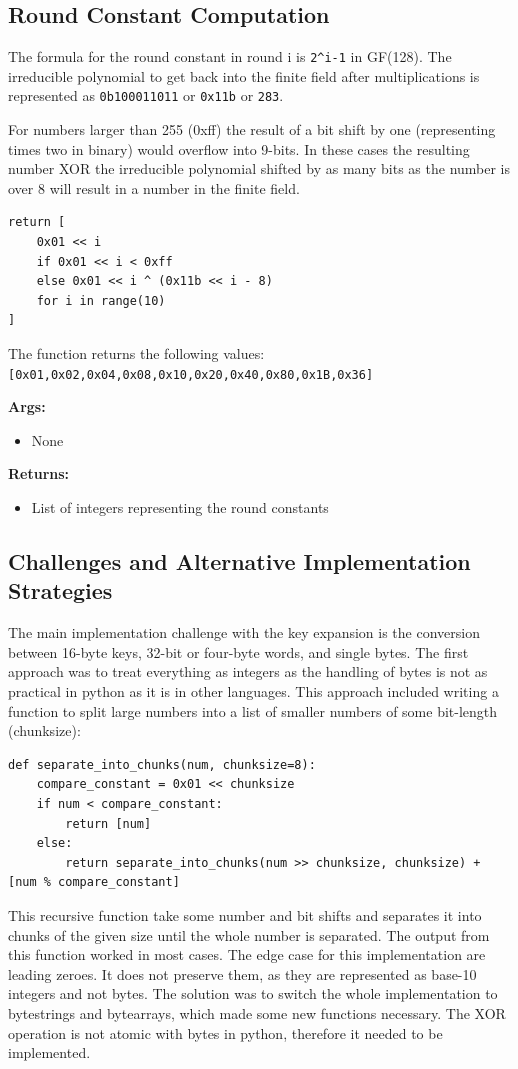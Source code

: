 \subsection{Round Constant Computation}
The formula for the round constant in round i is  \lstinline{2^i-1} in GF(128). The irreducible polynomial to get back into the finite field after multiplications is represented as  \lstinline{0b100011011} or  \lstinline{0x11b} or  \lstinline{283}.

For numbers larger than 255 (0xff) the result of a bit shift by one (representing times two in binary) would overflow into 9-bits. In these cases the resulting number XOR the irreducible polynomial shifted by as many bits as the number is over 8 will result in a number in the finite field.

\begin{lstlisting}
return [
    0x01 << i
    if 0x01 << i < 0xff
    else 0x01 << i ^ (0x11b << i - 8)
    for i in range(10)
]
\end{lstlisting}

The function returns the following values:
 \lstinline{[0x01,0x02,0x04,0x08,0x10,0x20,0x40,0x80,0x1B,0x36]}

\textbf{Args:}
\begin{itemize}
  \item None
\end{itemize}

\textbf{Returns:}
\begin{itemize}
  \item List of integers representing the round constants
\end{itemize}

\subsection{Challenges and Alternative Implementation Strategies}
The main implementation challenge with the key expansion is the conversion between 16-byte keys, 32-bit or four-byte words, and single bytes. The first approach was to treat everything as integers as the handling of bytes is not as practical in python as it is in other languages. This approach included writing a function to split large numbers into a list of smaller numbers of some bit-length (chunksize):
\begin{lstlisting}
def separate_into_chunks(num, chunksize=8):
    compare_constant = 0x01 << chunksize
    if num < compare_constant:
        return [num]
    else:
        return separate_into_chunks(num >> chunksize, chunksize) + [num % compare_constant]
\end{lstlisting}
This recursive function take some number and bit shifts and separates it into chunks of the given size until the whole number is separated. The output from this function worked in most cases. The edge case for this implementation are leading zeroes. It does not preserve them, as they are represented as base-10 integers and not bytes. The solution was to switch the whole implementation to bytestrings and bytearrays, which made some new functions necessary. The XOR operation is not atomic with bytes in python, therefore it needed to be implemented.

